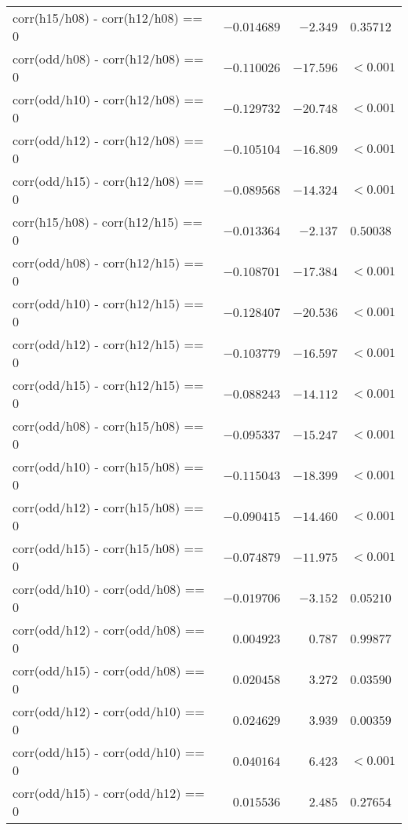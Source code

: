 \begin{table*}[t]
\begin{tabular}{l r r l}
corr(h15/h08) - corr(h12/h08)  == 0 & $ -0.014689 $ & $  -2.349 $ & $ 0.35712 $\tabularnewline
corr(odd/h08) - corr(h12/h08)  == 0 & $ -0.110026 $ & $ -17.596 $ & $< 0.001 $\tabularnewline
corr(odd/h10) - corr(h12/h08)  == 0 & $ -0.129732 $ & $ -20.748 $ & $< 0.001 $\tabularnewline
corr(odd/h12) - corr(h12/h08)  == 0 & $ -0.105104 $ & $ -16.809 $ & $< 0.001 $\tabularnewline
corr(odd/h15) - corr(h12/h08)  == 0 & $ -0.089568 $ & $ -14.324 $ & $< 0.001 $\tabularnewline
corr(h15/h08) - corr(h12/h15)  == 0 & $ -0.013364 $ & $  -2.137 $ & $ 0.50038 $\tabularnewline
corr(odd/h08) - corr(h12/h15)  == 0 & $ -0.108701 $ & $ -17.384 $ & $< 0.001 $\tabularnewline
corr(odd/h10) - corr(h12/h15)  == 0 & $ -0.128407 $ & $ -20.536 $ & $< 0.001 $\tabularnewline
corr(odd/h12) - corr(h12/h15)  == 0 & $ -0.103779 $ & $ -16.597 $ & $< 0.001 $\tabularnewline
corr(odd/h15) - corr(h12/h15)  == 0 & $ -0.088243 $ & $ -14.112 $ & $< 0.001 $\tabularnewline
corr(odd/h08) - corr(h15/h08)  == 0 & $ -0.095337 $ & $ -15.247 $ & $< 0.001 $\tabularnewline
corr(odd/h10) - corr(h15/h08)  == 0 & $ -0.115043 $ & $ -18.399 $ & $< 0.001 $\tabularnewline
corr(odd/h12) - corr(h15/h08)  == 0 & $ -0.090415 $ & $ -14.460 $ & $< 0.001 $\tabularnewline
corr(odd/h15) - corr(h15/h08)  == 0 & $ -0.074879 $ & $ -11.975 $ & $< 0.001 $\tabularnewline
corr(odd/h10) - corr(odd/h08)  == 0 & $ -0.019706 $ & $  -3.152 $ & $ 0.05210 $\tabularnewline
corr(odd/h12) - corr(odd/h08)  == 0 & $  0.004923 $ & $   0.787 $ & $ 0.99877 $\tabularnewline
corr(odd/h15) - corr(odd/h08)  == 0 & $  0.020458 $ & $   3.272 $ & $ 0.03590 $\tabularnewline
corr(odd/h12) - corr(odd/h10)  == 0 & $  0.024629 $ & $   3.939 $ & $ 0.00359 $\tabularnewline
corr(odd/h15) - corr(odd/h10)  == 0 & $  0.040164 $ & $   6.423 $ & $< 0.001 $\tabularnewline
corr(odd/h15) - corr(odd/h12)  == 0 & $  0.015536 $ & $   2.485 $ & $ 0.27654 $\tabularnewline
\bottomrule
\end{tabular}
\end{table*}
